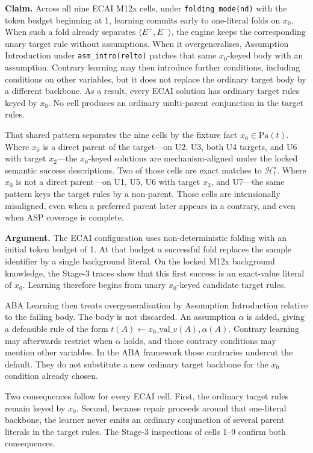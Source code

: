 \documentclass[11pt]{article}
\begin{document}
\textbf{Claim.} Across all nine ECAI M12x cells, under \texttt{folding\_mode(nd)} with the token budget beginning at 1, learning commits early to one-literal folds on \(x_0\). When such a fold already separates \(\langle E^+,E^-\rangle\), the engine keeps the corresponding unary target rule without assumptions. When it overgeneralises, Assumption Introduction under \texttt{asm\_intro(relto)} patches that same \(x_0\)-keyed body with an assumption. Contrary learning may then introduce further conditions, including conditions on other variables, but it does not replace the ordinary target body by a different backbone. As a result, every ECAI solution has ordinary target rules keyed by \(x_0\). No cell produces an ordinary multi-parent conjunction in the target rules.

That shared pattern separates the nine cells by the fixture fact \(x_0\in\mathrm{Pa}(t)\). Where \(x_0\) is a direct parent of the target---on U2, U3, both U4 targets, and U6 with target \(x_2\)---the \(x_0\)-keyed solutions are mechanism-aligned under the locked semantic success descriptions. Two of those cells are exact matches to \(\mathcal{H}_t^\star\). Where \(x_0\) is not a direct parent---on U1, U5, U6 with target \(x_3\), and U7---the same pattern keys the target rules by a non-parent. Those cells are intensionally misaligned, even when a preferred parent later appears in a contrary, and even when ASP coverage is complete.

\textbf{Argument.} The ECAI configuration uses non-deterministic folding with an initial token budget of 1. At that budget a successful fold replaces the sample identifier by a single background literal. On the locked M12x background knowledge, the Stage-3 traces show that this first success is an exact-value literal of \(x_0\). Learning therefore begins from unary \(x_0\)-keyed candidate target rules.

ABA Learning then treats overgeneralisation by Assumption Introduction relative to the failing body. The body is not discarded. An assumption \(\alpha\) is added, giving a defeasible rule of the form \(t(A)\leftarrow x_0\text{\_val\_}v(A),\alpha(A)\). Contrary learning may afterwards restrict when \(\alpha\) holds, and those contrary conditions may mention other variables. In the ABA framework those contraries undercut the default. They do not substitute a new ordinary target backbone for the \(x_0\) condition already chosen.

Two consequences follow for every ECAI cell. First, the ordinary target rules remain keyed by \(x_0\). Second, because repair proceeds around that one-literal backbone, the learner never emits an ordinary conjunction of several parent literals in the target rules. The Stage-3 inspections of cells 1--9 confirm both consequences.
\end{document}
